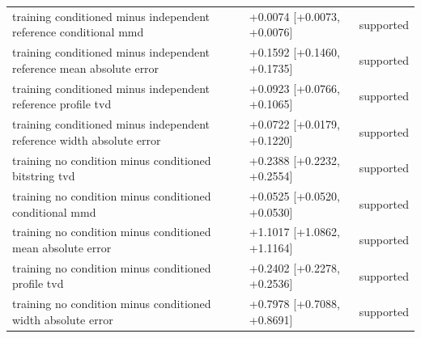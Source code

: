\begin{table}[p]
\begin{tabular}{@{}p{}p{}p{}@{}}
training conditioned minus independent reference conditional mmd & +0.0074 [+0.0073, +0.0076] & supported \\
training conditioned minus independent reference mean absolute error & +0.1592 [+0.1460, +0.1735] & supported \\
training conditioned minus independent reference profile tvd & +0.0923 [+0.0766, +0.1065] & supported \\
training conditioned minus independent reference width absolute error & +0.0722 [+0.0179, +0.1220] & supported \\
training no condition minus conditioned bitstring tvd & +0.2388 [+0.2232, +0.2554] & supported \\
training no condition minus conditioned conditional mmd & +0.0525 [+0.0520, +0.0530] & supported \\
training no condition minus conditioned mean absolute error & +1.1017 [+1.0862, +1.1164] & supported \\
training no condition minus conditioned profile tvd & +0.2402 [+0.2278, +0.2536] & supported \\
training no condition minus conditioned width absolute error & +0.7978 [+0.7088, +0.8691] & supported \\
\bottomrule
\end{tabular}
\end{table}
\clearpage
